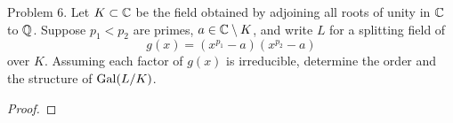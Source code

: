 \documentclass{article}
\begin{document}
\begin{subsection}{Problem 6.}
  Let $K \subset \mathbb C$ be the field obtained by adjoining all roots of unity in
  $\mathbb C$ to $\mathbb Q$. Suppose $p_1 < p_2$ are primes, $a \in \mathbb C \setminus K$, and
  write $L$ for a splitting field of \[
    g(x) = (x^{p_1} - a)(x^{p_2} - a)
  \] over $K$. Assuming each factor of $g(x)$ is irreducible, determine the
  order and the structure of $\operatorname{Gal}(L/K)$.
\end{subsection}

\begin{proof}
\end{proof}
\end{document}
